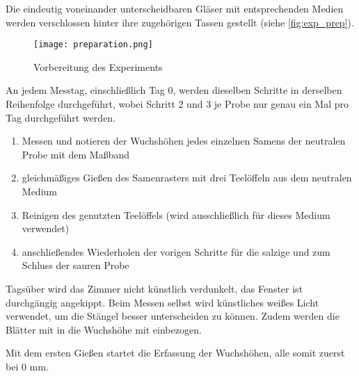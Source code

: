         Die eindeutig voneinander unterscheidbaren Gläser mit entsprechenden Medien werden verschlossen hinter ihre zugehörigen Tassen gestellt (siehe \autoref{fig:exp_prep}).
        \begin{figure}[h]
            \centering
            \texttt{[image: preparation.png]}
            \caption{Vorbereitung des Experiments}
            \label{fig:exp_prep}
        \end{figure}

        \newpage
        An jedem Messtag, einschließlich Tag 0, werden dieselben Schritte in derselben Reihenfolge durchgeführt, wobei Schritt 2 und 3 je Probe nur genau ein Mal pro Tag durchgeführt werden.
        \begin{enumerate}[1.]
            \item Messen und notieren der Wuchshöhen jedes einzelnen Samens der neutralen Probe mit dem Maßband
            \item gleichmäßiges Gießen des Samenrasters mit drei Teelöffeln aus dem neutralen Medium
            \item Reinigen des genutzten Teelöffels (wird ausschließlich für dieses Medium verwendet)
            \item anschließendes Wiederholen der vorigen Schritte für die salzige und zum Schluss der sauren Probe
        \end{enumerate}
        Tagsüber wird das Zimmer nicht künstlich verdunkelt, das Fenster ist durchgängig angekippt. Beim Messen selbst wird künstliches weißes Licht verwendet, um die Stängel besser unterscheiden zu können. Zudem werden die Blätter mit in die Wuchshöhe mit einbezogen.

        Mit dem ersten Gießen startet die Erfassung der Wuchshöhen, alle somit zuerst\\bei 0 mm.
    
